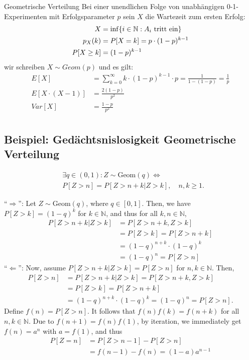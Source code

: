 \begin{definition}{Geometrische Verteilung}
Bei einer unendlichen Folge von unabhängigen 0-1-Experimenten mit
Erfolgsparameter $p$ sein $X$ die Wartezeit zum ersten Erfolg:
\begin{align*}
  X       & = \inf \{ i \in \mathbb{N} : A_i \text{ tritt ein} \} \\
  p_X (k) & = P[X = k] = p \cdot  (1-p)^{k-1}\\
  P[X \geq k] &= (1 - p)^{k - 1}
\end{align*}
wir schreiben $X \sim Geom (p)$ und es gilt:
\begin{align*}
  E[X]              & = \sum_{k = 0}^\infty  k \cdot (1-p)^{k-1} \cdot p
  = \frac{1}{1- (1-p)} = \frac{1}{p}                 \\
  E[X \cdot  (X-1)] & = \frac{2 (1-p)}{p^2}          \\
  Var[X]            & = \frac{1-p}{p^2}\\
\end{align*}
\end{definition}
\BoxStart{}
\subsection{Beispiel: Gedächtsnislosigkeit Geometrische Verteilung}
\begin{align*}
  &\exists q \in (0, 1) : Z \sim \text{Geom}(q) \Leftrightarrow \\
  &P[Z > n] = P[Z > n + k | Z > k], \quad n, k \geq 1.
\end{align*}

``$\Rightarrow$'': Let $Z \sim \text{Geom}(q)$, where $q \in [0, 1]$. Then, we have $P[Z > k] = (1 - q)^k$ for $k \in \mathbb{N}$, and thus for all $k, n \in \mathbb{N}$,
\begin{align*}
P[Z > n + k | Z > k] &= P[Z > n + k, Z > k] \\
&= P[Z > k] = P[Z > n + k] \\
&= (1 - q)^{n+k} \cdot (1 - q)^k \\
&= (1 - q)^n = P[Z > n]
\end{align*}
``$\Leftarrow$'': Now, assume $P[Z > n + k | Z > k] = P[Z > n]$ for $n, k \in \mathbb{N}$. Then,
\begin{align*}
P[Z > n] &= P[Z > n + k | Z > k] = P[Z > n + k, Z > k] \\
&= P[Z > k] = P[Z > n + k] \\
&= (1 - q)^{n+k} \cdot (1 - q)^k = (1 - q)^n = P[Z > n].
\end{align*}
Define $f(n) = P[Z > n]$. It follows that $f(n)f(k) = f(n + k)$ for all $n, k \in \mathbb{N}$. Due to $f(n + 1) = f(n)f(1)$, by iteration, we immediately get $f(n) = a^n$ with $a = f(1)$, and thus
\begin{align*}
  P[Z = n] &= P[Z > n - 1] - P[Z > n]\\
  &= f(n - 1) - f(n) = (1 - a)a^{n-1}
\end{align*}

